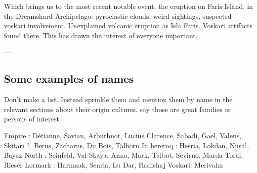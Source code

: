 Which brings us to the most recent notable event, the eruption on Faris Island, in the Dreamshard Archipelago: pyroclastic clouds, weird sightings, suspected voskari involvement. Unexplained volcanic eruption as Isla Faris. Voskari artifacts found there. This has drawn the interest of everyone important.








---




\subsection{Some examples of names}

Don't make a list. Instead sprinkle them and mention them by name in the relevant sections about their origin cultures. say those are great families or persons of interest

Empire : Détianne, Savian, Arbuthnot, Lucius Clarence, Sabadi, Gael, Valens, Skitari ?, Berus, Zacharus, Du Bois, Talborn
In hereroq : Hesria, Lokdan, Nusal, Bayaz
North : Seinfeld, Val-Skaya, Anna, Mark, Talbot, Sevirno, Marda-Torai, Rieser
Lormark : Harmaak, Senria, Lu Dar, Radishaj
Voskari: Merivahn

